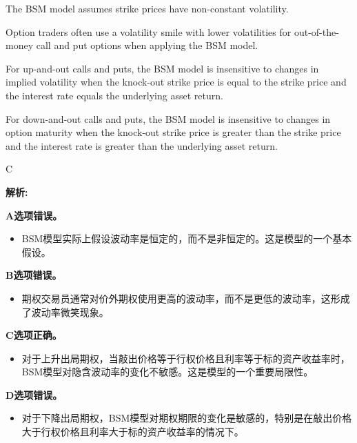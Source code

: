 \documentclass{article}
\newenvironment{explanation}
{\textbf{解析:}\par}
{\par}
\begin{document}
\begin{choices}
    \item The BSM model assumes strike prices have non-constant volatility.
    \item Option traders often use a volatility smile with lower volatilities for out-of-the-money call
    and put options when applying the BSM model.
    \item For up-and-out calls and puts, the BSM model is insensitive to changes in implied volatility
    when the knock-out strike price is equal to the strike price and the interest rate equals the
    underlying asset return.
    \item For down-and-out calls and puts, the BSM model is insensitive to changes in option maturity
    when the knock-out strike price is greater than the strike price and the interest rate is
    greater than the underlying asset return.
\end{choices}

\begin{correctanswer}
    C
\end{correctanswer}

\begin{explanation}
    \textbf{A选项错误。}
    \begin{itemize}
        \item BSM模型实际上假设波动率是恒定的，而不是非恒定的。这是模型的一个基本假设。
    \end{itemize}
    
    \textbf{B选项错误。}
    \begin{itemize}
        \item 期权交易员通常对价外期权使用更高的波动率，而不是更低的波动率，这形成了波动率微笑现象。
    \end{itemize}
    
    \textbf{C选项正确。}
    \begin{itemize}
        \item 对于上升出局期权，当敲出价格等于行权价格且利率等于标的资产收益率时，BSM模型对隐含波动率的变化不敏感。这是模型的一个重要局限性。
    \end{itemize}
    
    \textbf{D选项错误。}
    \begin{itemize}
        \item 对于下降出局期权，BSM模型对期权期限的变化是敏感的，特别是在敲出价格大于行权价格且利率大于标的资产收益率的情况下。
    \end{itemize}
\end{explanation}
\end{document}
